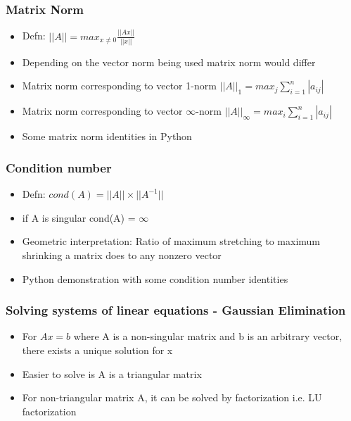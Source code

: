 \documentclass{beamer}
\begin{document}
\begin{frame}
\frametitle{Matrix Norm}

\begin{itemize}
\item Defn: $||A|| = max_{x \neq 0} \frac{||Ax||}{||x||}$
\item Depending on the vector norm being used matrix norm would differ
\item Matrix norm corresponding to vector 1-norm $||A||_1 = max_j \sum_{i=1}^n |a_{ij}|$
\item Matrix norm corresponding to vector $\infty$-norm $||A||_{\infty} = max_i \sum_{i=1}^n |a_{ij}|$
\item Some matrix norm identities in Python
\end{itemize}

\end{frame}



\begin{frame}
\frametitle{Condition number}

\begin{itemize}
\item Defn: $cond(A) = ||A|| \times ||A^{-1}||$
\item if A is singular cond(A) = $\infty$
\item Geometric interpretation: Ratio of maximum stretching to maximum shrinking a matrix does to any nonzero vector
\item Python demonstration with some condition number identities
\end{itemize}

\end{frame}



\begin{frame}
\frametitle{Solving systems of linear equations - Gaussian Elimination}

\begin{itemize}
\item For $Ax = b$ where A is a non-singular matrix and b is an arbitrary vector, there exists a unique solution for x 
\item Easier to solve is A is a triangular matrix
\item For non-triangular matrix A, it can be solved by factorization i.e. LU factorization
\end{itemize}

\end{frame}
\end{document}
